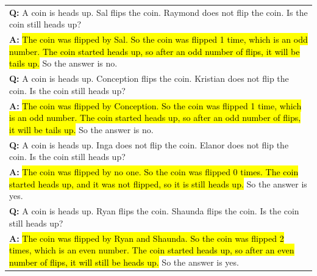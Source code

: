 \begin{table}[H]
\begin{tabular}{p{\linewidth}}
        \vspace{0mm}
        \textbf{Q:} A coin is heads up. Sal flips the coin. Raymond does not flip the coin. Is the coin still heads up? \\
        \vspace{-1mm}
        \textbf{A:} \hl{The coin was flipped by Sal. So the coin was flipped 1 time, which is an odd number. The coin started heads up, so after an odd number of flips, it will be tails up.} So the answer is no. \\
        \vspace{0mm}
        \textbf{Q:} A coin is heads up. Conception flips the coin. Kristian does not flip the coin. Is the coin still heads up? \\
        \vspace{-1mm}
        \textbf{A:} \hl{The coin was flipped by Conception. So the coin was flipped 1 time, which is an odd number. The coin started heads up, so after an odd number of flips, it will be tails up.} So the answer is no. \\
        \vspace{0mm}
        \textbf{Q:} A coin is heads up. Inga does not flip the coin. Elanor does not flip the coin. Is the coin still heads up? \\
        \vspace{-1mm}
        \textbf{A:} \hl{The coin was flipped by no one. So the coin was flipped 0 times. The coin started heads up, and it was not flipped, so it is still heads up.} So the answer is yes. \\
        \vspace{0mm}
        \textbf{Q:} A coin is heads up. Ryan flips the coin. Shaunda flips the coin. Is the coin still heads up? \\
        \vspace{-1mm}
        \textbf{A:} \hl{The coin was flipped by Ryan and Shaunda. So the coin was flipped 2 times, which is an even number. The coin started heads up, so after an even number of flips, it will still be heads up.} So the answer is yes. \\
        \bottomrule
    \end{tabular}
    \label{tab:appendix-coinflip-prompt}
\end{table}
\endgroup